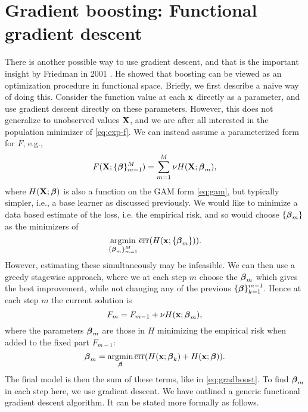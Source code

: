 \section{Gradient boosting: Functional gradient descent}
There is another possible way to use gradient descent, and that is the important insight by Friedman in 2001 \citep{friedman2001}. He showed that boosting can be viewed as an optimization procedure in functional space. Briefly, we first describe a naive way of doing this. Consider the function value at each $\mathbf{x}$ directly as a parameter, and use gradient descent directly on these parameters. However, this does not generalize to unobserved values $\mathbf{X}$, and we are after all interested in the population minimizer of \eqref{eq:exp-f}. We can instead assume a parameterized form for $F$, e.g.,
\begin{equation}\label{eq:gradboost}
    F(\mathbf{X};\{\boldsymbol{\beta}\}_{m=1}^M)=\sum_{m=1}^M\nu H(\mathbf{X};\boldsymbol{\beta}_m),
\end{equation}
where $H(\mathbf{X};\boldsymbol{\beta})$ is also a function on the GAM form \eqref{eq:gam}, but typically simpler, i.e., a base learner as discussed previously. We would like to minimize a data based estimate of the loss, i.e. the empirical risk, and so would choose $\{\boldsymbol{\beta}_m\}$ as the minimizers of 
\begin{equation*}
    \operatorname*{argmin}_{\{\boldsymbol{\beta}_m\}_{m=1}^M}\overline{\text{err}}(H(\mathbf{x};\{\boldsymbol{\beta}_m\})).
\end{equation*}
However, estimating these simultaneously may be infeasible. We can then use a greedy stagewise approach, where we at each step $m$ choose the $\boldsymbol{\beta}_m$ which gives the best improvement, while not changing any of the previous $\{\boldsymbol{\beta}\}_{k=1}^{m-1}$. Hence at each step $m$ the current solution is
\begin{equation*}
    F_{m}=F_{m-1}+\nu H(\mathbf{x};\boldsymbol{\beta}_m),
\end{equation*}
where the parameters $\boldsymbol{\beta}_m$ are those in $H$ minimizing the empirical risk when added to the fixed part $F_{m-1}$:
\begin{equation*}
    \boldsymbol{\beta}_m=\operatorname*{argmin}_{\boldsymbol{\beta}}\overline{\text{err}}(H(\mathbf{x};\boldsymbol{\beta}_k)+H(\mathbf{x};\boldsymbol{\beta})).
\end{equation*}
The final model is then the sum of these terms, like in \eqref{eq:gradboost}. To find $\boldsymbol{\beta}_m$ in each step here, we use gradient descent. We have outlined a generic functional gradient descent algorithm. It can be stated more formally as follows.
